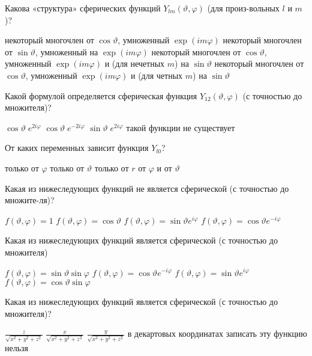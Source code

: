 \documentclass[11pt,a4paper]{exam}
\begin{document}
\begin{questions}
\question Какова «структура» сферических функций ${Y_{lm}}(\vartheta ,\varphi )$ (для произ-вольных $l$ и $m$)?
\begin{choices}
\choice некоторый многочлен от $\cos \vartheta $, умноженный $\exp (im\varphi )$
\choice некоторый многочлен от $\sin \vartheta $, умноженный на $\exp (im\varphi )$
\choice некоторый многочлен от $\cos \vartheta $, умноженный $\exp (im\varphi )$ и (для нечетных $m$) на $\sin \vartheta $
\choice некоторый многочлен от $\cos \vartheta $, умноженный $\exp (im\varphi )$ и (для четных $m$) на $\sin \vartheta $
\end{choices}

\question Какой формулой определяется сферическая функция ${Y_{12}}(\vartheta ,\varphi )$ (с точностью до множителя)?
\begin{choices}
\choice $\cos \vartheta \;{e^{2i\varphi }}$    
\choice $\cos \vartheta \;{e^{ - 2i\varphi }}$    
\choice $\sin \vartheta \;{e^{2i\varphi }}$    
\choice такой функции не существует
\end{choices}

\question От каких переменных зависит функция ${Y_{l0}}$?
\begin{choices}
\choice только от $\varphi $    
\choice только от $\vartheta $
\choice только от $r$     
\choice от $\varphi $ и от $\vartheta $
\end{choices}

\question Какая из нижеследующих функций не является сферической (с точностью до множите-ля)?
\begin{choices}
\choice $f(\vartheta ,\varphi ) = 1$     
\choice $f(\vartheta ,\varphi ) = \cos \vartheta $   
\choice $f(\vartheta ,\varphi ) = \sin \vartheta {e^{i\varphi }}$      
\choice $f(\vartheta ,\varphi ) = \cos \vartheta {e^{ - i\varphi }}$
\end{choices}

\question Какая из нижеследующих функций является сферической (с точностью до множителя)
\begin{choices}
\choice $f(\vartheta ,\varphi ) = \sin \vartheta \sin \varphi $     
\choice $f(\vartheta ,\varphi ) = \cos \vartheta {e^{ - i\varphi }}$
\choice $f(\vartheta ,\varphi ) = \sin \vartheta {e^{i\varphi }}$         
\choice $f(\vartheta ,\varphi ) = \cos \vartheta \sin \varphi $
\end{choices}

\question Какая из нижеследующих функций является сферической (с точностью до множителя)?
\begin{choices}
\choice $\frac{z}{{\sqrt {{x^2} + {y^2} + {z^2}} }}$    
\choice $\frac{x}{{\sqrt {{x^2} + {y^2} + {z^2}} }}$    
\choice $\frac{y}{{\sqrt {{x^2} + {y^2} + {z^2}} }}$
\choice в декартовых координатах записать эту функцию нельзя
\end{choices}


\end{questions}
\end{document}
